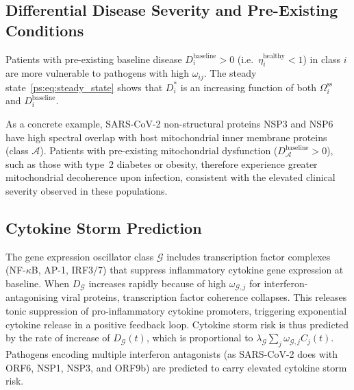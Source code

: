 \subsection{Differential Disease Severity and Pre-Existing Conditions}

Patients with pre-existing baseline disease $D_i^{\text{baseline}} > 0$ (i.e.\
$\eta_i^{\text{healthy}} < 1$) in class $i$ are more vulnerable to pathogens
with high $\omega_{ij}$. The steady state~\eqref{ps:eq:steady_state} shows that
$D_i^*$ is an increasing function of both $\Omega_i^{\text{ss}}$ and
$D_i^{\text{baseline}}$.

As a concrete example, SARS-CoV-2 non-structural proteins NSP3 and NSP6 have
high spectral overlap with host mitochondrial inner membrane proteins (class
$\mathcal{A}$). Patients with pre-existing mitochondrial dysfunction
($D_\mathcal{A}^{\text{baseline}} > 0$), such as those with type~2 diabetes or
obesity, therefore experience greater mitochondrial decoherence upon infection,
consistent with the elevated clinical severity observed in these populations.

\subsection{Cytokine Storm Prediction}

The gene expression oscillator class $\mathcal{G}$ includes transcription factor
complexes (NF-$\kappa$B, AP-1, IRF3/7) that suppress inflammatory cytokine gene
expression at baseline. When $D_\mathcal{G}$ increases rapidly because of high
$\omega_{\mathcal{G},j}$ for interferon-antagonising viral proteins, transcription
factor coherence collapses. This releases tonic suppression of pro-inflammatory
cytokine promoters, triggering exponential cytokine release in a positive
feedback loop. Cytokine storm risk is thus predicted by the rate of increase of
$D_\mathcal{G}(t)$, which is proportional to $\lambda_\mathcal{G} \sum_j
\omega_{\mathcal{G},j} C_j(t)$. Pathogens encoding multiple interferon
antagonists (as SARS-CoV-2 does with ORF6, NSP1, NSP3, and ORF9b) are
predicted to carry elevated cytokine storm risk.

